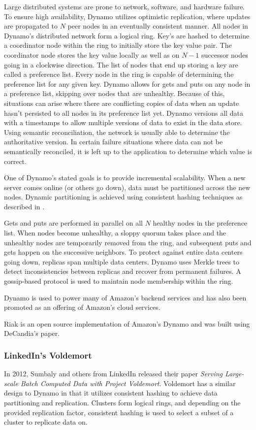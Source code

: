 \documentclass[]{article}
\begin{document}
Large distributed systems are prone to network, software, and hardware failure. To ensure high availability, Dynamo utilizes optimistic replication, where updates are propagated to $N$ peer nodes in an eventually consistent manner. All nodes in Dynamo's distributed network form a logical ring. Key's are hashed to determine a coordinator node within the ring to initially store the key value pair. The coordinator node stores the key value locally as well as on $N-1$ successor nodes going in a clockwise direction. The list of nodes that end up storing a key are called a preference list. Every node in the ring is capable of determining the preference list for any given key. Dynamo allows for gets and puts on any node in a preference list, skipping over nodes that are unhealthy. Because of this, situations can arise where there are conflicting copies of data when an update hasn't persisted to all nodes in its preference list yet. Dynamo versions all data with a timestamps to allow multiple versions of data to exist in the data store. Using semantic reconciliation, the network is usually able to determine the authoritative version. In certain failure situations where data can not be semantically reconciled, it is left up to the application to determine which value is correct.  

One of Dynamo's stated goals is to provide incremental scalability. When a new server comes online (or others go down), data must be partitioned across the new nodes. Dynamic partitioning is achieved using consistent hashing techniques as described in \cite{karger_consistent_1997}.

Gets and puts are performed in parallel on all $N$ healthy nodes in the preference list. When nodes become unhealthy, a sloppy quorum takes place and the unhealthy nodes are temporarily removed from the ring, and subsequent puts and gets happen on the successive neighbors. To protect against entire data centers going down, replicas span multiple data centers. Dynamo uses Merkle trees to detect inconsistencies between replicas and recover from permanent failures. A gossip-based protocol is used to maintain node membership within the ring.

Dynamo is used to power many of Amazon's backend services and has also been promoted as an offering of Amazon's cloud services.

Riak\cite{Klophaus:2010:RCB:1900160.1900176} is an open source implementation of Amazon's Dynamo and was built using DeCandia's paper.

\subsubsection{LinkedIn's Voldemort}
In 2012, Sumbaly and others from LinkedIn released their paper \textit{Serving Large-scale Batch Computed Data with Project Voldemort}\cite{Sumbaly:2012:SLB:2208461.2208479}. Voldemort has a similar design to Dynamo in that it utilizes consistent hashing to achieve data partitioning and replication. Clusters form logical rings, and depending on the provided replication factor, consistent hashing is used to select a subset of a cluster to replicate data on.
\end{document}
